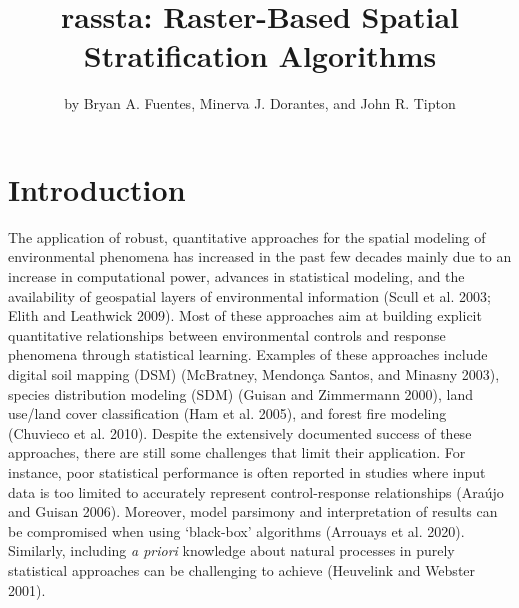 \title{rassta: Raster-Based Spatial Stratification Algorithms}
\author{by Bryan A. Fuentes, Minerva J. Dorantes, and John R. Tipton}

\maketitle


\hypertarget{introduction}{%
\section{Introduction}\label{introduction}}

The application of robust, quantitative approaches for the spatial modeling of
environmental phenomena has increased in the past few decades mainly due to an
increase in computational power, advances in statistical modeling, and the
availability of geospatial layers of environmental information (Scull et al. 2003; Elith and Leathwick 2009). Most of these approaches aim at building explicit quantitative
relationships between environmental controls and response phenomena through
statistical learning. Examples of these approaches include digital soil mapping
(DSM) (McBratney, Mendonça Santos, and Minasny 2003), species distribution modeling (SDM) (Guisan and Zimmermann 2000), land
use/land cover classification (Ham et al. 2005), and forest fire modeling
(Chuvieco et al. 2010). Despite the extensively documented success of these approaches,
there are still some challenges that limit their application. For instance, poor
statistical performance is often reported in studies where input data is too
limited to accurately represent control-response relationships (Araújo and Guisan 2006).
Moreover, model parsimony and interpretation of results can be compromised when
using `black-box' algorithms (Arrouays et al. 2020). Similarly, including \emph{a priori}
knowledge about natural processes in purely statistical approaches can be
challenging to achieve (Heuvelink and Webster 2001).

